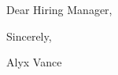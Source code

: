 \documentclass[9pt]{developercv} %
\begin{document}
\subject{Application for Web App Architect Position} %

\makeletterhead %

Dear Hiring Manager,

\vspace{0.5cm}

\lorem \lorem \lorem \lorem

\vspace{0.5cm}

\lorem \lorem \lorem \lorem

\vspace{0.5cm}

\lorem \lorem \lorem \lorem

\vspace{1cm}

Sincerely,

\vspace{0.5cm}

Alyx Vance

\end{document}
